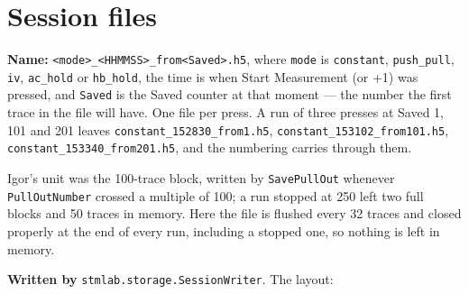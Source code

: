 \section{Session files}

\textbf{Name:} \texttt{<mode>\_\discretionary{}{}{}<HHMMSS>\_\discretionary{}{}{}from<Saved>.\discretionary{}{}{}h5}, where \texttt{mode} is \texttt{constant}, \texttt{push\_\discretionary{}{}{}pull}, \texttt{iv}, \texttt{ac\_\discretionary{}{}{}hold} or \texttt{hb\_\discretionary{}{}{}hold}, the time is when Start Measurement (or +1) was pressed, and \texttt{Saved} is the Saved counter at that moment --- the number the first trace in the file will have. One file per press. A run of three presses at Saved 1, 101 and 201 leaves \texttt{constant\_\discretionary{}{}{}152830\_\discretionary{}{}{}from1.\discretionary{}{}{}h5}, \texttt{constant\_\discretionary{}{}{}153102\_\discretionary{}{}{}from101.\discretionary{}{}{}h5}, \texttt{constant\_\discretionary{}{}{}153340\_\discretionary{}{}{}from201.\discretionary{}{}{}h5}, and the numbering carries through them.

Igor's unit was the 100-trace block, written by \texttt{Save\discretionary{}{}{}Pull\discretionary{}{}{}Out} whenever \texttt{Pull\discretionary{}{}{}Out\discretionary{}{}{}Number} crossed a multiple of 100; a run stopped at 250 left two full blocks and 50 traces in memory. Here the file is flushed every 32 traces and closed properly at the end of every run, including a stopped one, so nothing is left in memory.

\textbf{Written by} \texttt{stmlab.\discretionary{}{}{}storage.\discretionary{}{}{}Session\discretionary{}{}{}Writer}. The layout:

